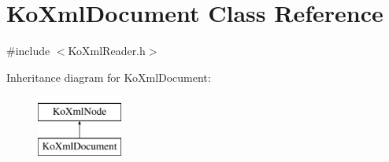 \hypertarget{classKoXmlDocument}{
\section{KoXmlDocument Class Reference}
\label{classKoXmlDocument}
}


{\ttfamily \#include $<$KoXmlReader.h$>$}

Inheritance diagram for KoXmlDocument:\begin{figure}[H]
\begin{center}
\leavevmode
\includegraphics[height=2cm]{classKoXmlDocument}
\end{center}
\end{figure}
